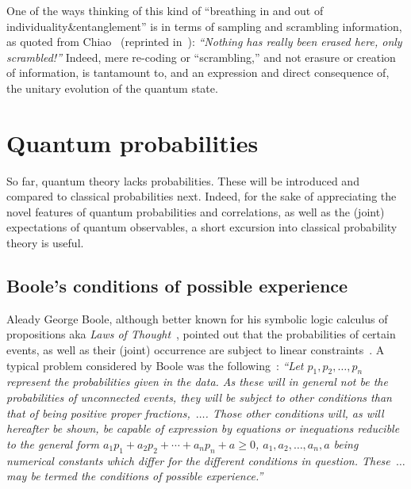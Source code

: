 
One of the ways thinking of this kind of  ``breathing in and out of individuality{\&}entanglement'' is in terms of
sampling and scrambling information,
as quoted from Chiao~\cite[p.~27]{green-horn-zei} (reprinted in~\cite{Macchiavello-2001}):
{\em ``Nothing has really been erased here, only scrambled!''}
Indeed, mere re-coding or ``scrambling,''
and not erasure or creation of information, is tantamount to,
and an expression and direct consequence of,
the unitary evolution of the quantum state.



\section{Quantum probabilities}
\label{2016-pu-book-chapter-qp} %

So far, quantum theory lacks probabilities. These will be introduced and compared to classical probabilities next.
Indeed, for the sake of appreciating the novel features of quantum probabilities and correlations, as well as the (joint) expectations
of quantum observables, a short excursion into classical probability theory is useful.



\subsection{Boole's conditions of possible experience}
\label{2017-b-eh}



Aleady George Boole, although better known for his symbolic logic calculus of propositions aka {\em Laws of Thought}~\cite{Boole},
pointed out that the  probabilities of certain events,
as well as their (joint) occurrence  are subject to linear
constraints~\cite{Boole,Boole-62,Frechet1935,Hailperin-1965,Hailperin-86,Ursic1984,Ursic:1986:GFL:3023712.3023752,Ursic1988,Beltrametti-1991,Pykacz-1991,Pulmannova-1992,Beltrametti-1993,Beltrametti-1994,DvurLaen-1994,Beltrametti1995,Beltrametti-1995,Noce-1995,Laenger1995,DvurLaen-1995,DvurLaen-1995b,Beltrametti-1996,Pulmannova-2002}.
A typical problem considered by Boole was the following~\cite[p.~229]{Boole-62}:
{\em ``Let $p_1, p_2,\ldots , p_n$ represent the probabilities given in the data. As
these will in general not be the probabilities of unconnected events, they will be subject
to other conditions than that of being positive proper fractions,~$\ldots$.
Those other conditions will, as will hereafter be shown, be capable of expression by
equations or inequations reducible to the general form
$a_1 p_1 + a_2p_2 + \cdots + a_n p_n +a \ge 0$,
$a_1, a_2, \ldots , a_n, a$ being numerical constants which differ for the different conditions in
question. These~$\ldots$ may be termed the conditions of possible
experience.''}

